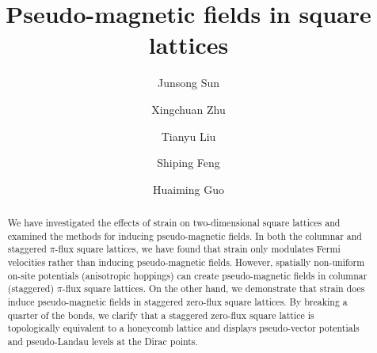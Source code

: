 \documentclass[aps, twocolumn, floatfix, superscriptaddress, prb]{revtex4-1}
\begin{document}
\title{Pseudo-magnetic fields in square lattices}

\author{Junsong Sun}

\author{Xingchuan Zhu }

\author{Tianyu Liu}

\author{Shiping Feng}

\author{Huaiming Guo}


\begin{abstract}
We have investigated the effects of strain on two-dimensional square lattices and examined the methods for inducing pseudo-magnetic fields. In both the columnar and staggered $\pi$-flux square lattices, we have found that strain only modulates Fermi velocities rather than inducing pseudo-magnetic fields. However, spatially non-uniform on-site potentials (anisotropic hoppings) can create pseudo-magnetic fields in columnar (staggered) $\pi$-flux square lattices. On the other hand, we demonstrate that strain does induce pseudo-magnetic fields in staggered zero-flux square lattices. By breaking a quarter of the bonds, we clarify that a staggered zero-flux square lattice is topologically equivalent to a honeycomb lattice and displays pseudo-vector potentials and pseudo-Landau levels at the Dirac points.
\end{abstract}



\maketitle
\end{document}
